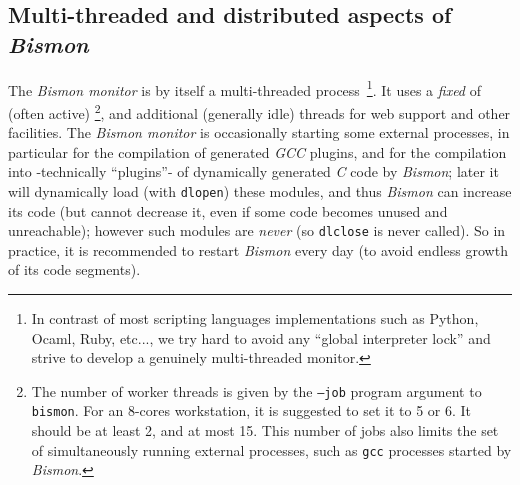 

\subsection{Multi-threaded and distributed aspects of \textit{Bismon}}
\label{subsec:multithreadist}

The \textit{Bismon monitor} is by itself a multi-threaded
process~\footnote{In contrast of most scripting languages
  implementations such as Python, Ocaml, Ruby, etc..., we try hard to
  avoid any ``global interpreter lock'' and strive to develop a
  genuinely multi-threaded monitor.}.
It uses a \emph{fixed} {} of
{} (often active)
\footnote{The number of worker threads is given by the \texttt{--job}
  program argument to \texttt{bismon}. For an 8-cores workstation, it
  is suggested to set it to 5 or 6. It should be at least 2, and at
  most 15. This number of jobs also limits the set of simultaneously
  running external processes, such as \texttt{gcc} processes started
  by \emph{Bismon}.}, and additional (generally idle) threads for web
support and other facilities. The \textit{Bismon monitor} is
occasionally starting some external processes, in particular for the
compilation of generated \emph{GCC} plugins, and for the compilation
into  -technically ``plugins''- of
dynamically generated \emph{C} code by \textit{Bismon}; later it will
dynamically load (with \texttt{dlopen}) these modules, and thus
\textit{Bismon} can increase its code (but cannot decrease it, even if
some code becomes unused and unreachable); however such modules are
\emph{never}  (so
\texttt{dlclose} is never called). So in practice, it is recommended
to restart \emph{Bismon} every day (to avoid endless growth of its
code segments).


